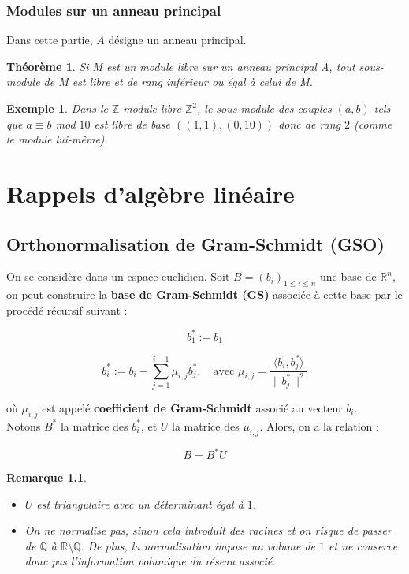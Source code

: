 \documentclass[a4paper,12pt]{report}  %
\theoremstyle{definitionstyle}
\theoremstyle{examplestyle}
\newtheorem{example}{Exemple}[chapter] %
\theoremstyle{remarkstyle}
\newtheorem{remark}{Remarque}[chapter] %
\theoremstyle{propositionstyle}
\theoremstyle{theoremstyle}
\newtheorem{theoreme}{Théorème}[chapter]  %
\begin{document}
	\subsection{Modules sur un anneau principal}
	Dans cette partie, $A$ désigne un anneau principal.
	
	\begin{theoreme}
	Si M est un module libre sur un anneau principal A, tout sous-module de M est libre et de rang inférieur ou égal à celui de M.
	\end{theoreme}


	\begin{example}
		Dans le $\mathbb{Z}$-module libre $\mathbb{Z}^2$, le sous-module des couples $(a, b)$ tels que $a \equiv b$ mod $10$ est libre de base $((1,1), (0, 10))$ donc de rang $2$ (comme le module lui-même).
	\end{example}
	
	
	
	\chapter{Rappels d'algèbre linéaire}
	
	
	\section{Orthonormalisation de Gram-Schmidt (GSO)}
	
	On se considère dans un espace euclidien. Soit \( B = (b_i)_{1 \leq i \leq n} \) une base de \( \mathbb{R}^n \), on peut construire la \textbf{base de Gram-Schmidt (GS)} associée à cette base par le procédé récursif suivant :
	
	
	$$b_1^* := b_1$$
	
	
	$$b_i^* := b_i - \sum_{j=1}^{i-1} \mu_{i,j} b_j^*, \quad \text{avec } \mu_{i,j} = \frac{\langle b_i, b_j^* \rangle}{\| b_j^* \|^2}$$
	
	où \( \mu_{i,j} \) est appelé \textbf{coefficient de Gram-Schmidt} associé au vecteur \( b_i \). \\
	
	Notons \( B^* \) la matrice des \( b_i^* \), et \( U \) la matrice des \( \mu_{i,j} \). Alors, on a la relation :
	
	$$B = B^* U$$
	
	 \begin{remark}
	 	\begin{itemize}
	 		\item  $U$ est triangulaire avec un déterminant égal à $1$.
	 		\item On ne normalise pas, sinon cela introduit des racines et on risque de passer de \( \mathbb{Q} \) à \( \mathbb{R} \setminus \mathbb{Q} \). De plus, la normalisation impose un volume de $1$ et ne conserve donc pas l'information volumique du réseau associé.
	 	\end{itemize}
 	\end{remark}
	
\end{document}
